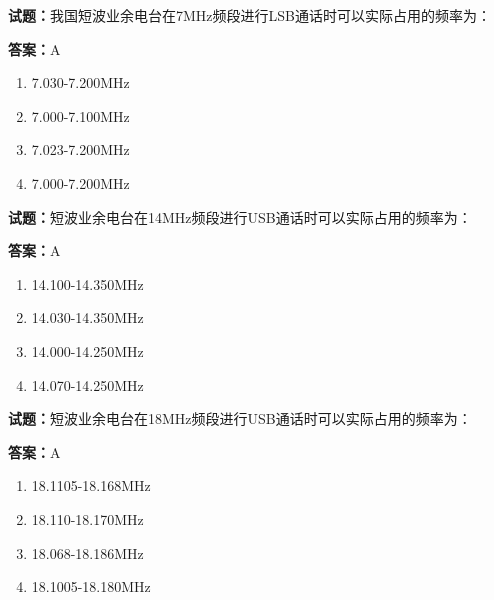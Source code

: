 \documentclass{ctexbook}
\begin{document}




\vspace{1em}

\textbf{试题：}我国短波业余电台在7MHz频段进行LSB通话时可以实际占用的频率为： 

\textbf{答案：}A 

\begin{enumerate}[leftmargin=3em]
  \item 7.030-7.200MHz 

  \item 7.000-7.100MHz 

  \item 7.023-7.200MHz 

  \item 7.000-7.200MHz 

\end{enumerate}





\vspace{1em}

\textbf{试题：}短波业余电台在14MHz频段进行USB通话时可以实际占用的频率为： 


\textbf{答案：}A 

\begin{enumerate}[leftmargin=3em]
  \item 14.100-14.350MHz 

  \item 14.030-14.350MHz 

  \item 14.000-14.250MHz 

  \item 14.070-14.250MHz 

\end{enumerate}





\vspace{1em}

\textbf{试题：}短波业余电台在18MHz频段进行USB通话时可以实际占用的频率为： 

\textbf{答案：}A 

\begin{enumerate}[leftmargin=3em]
  \item 18.1105-18.168MHz 

  \item 18.110-18.170MHz 

  \item 18.068-18.186MHz 

  \item 18.1005-18.180MHz 

\end{enumerate}
\end{document}
